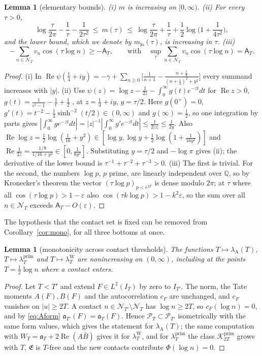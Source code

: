 \documentclass[11pt]{amsart}
\newtheorem{lemma}[theorem]{Lemma}
\theoremstyle{definition}
\theoremstyle{remark}
\newcommand{\Q}{\mathbb Q}
\newcommand{\Rel}{\operatorname{Re}}
\newcommand{\Kp}{\mathcal K^{\mathrm{prim}}_{2T}}
\newcommand{\PT}{\mathcal P_T}
\newcommand{\IT}{I_T}
\newcommand{\lamP}{\lambda^{\mathrm{prim}}_T}
\newcommand{\lamW}{\lambda^{\mathrm W}_T}
\newcommand{\lamA}{\lambda_{\mathrm A}(T)}
\newcommand{\cF}{c_F}
\newcommand{\Lev}{\mathfrak E}
\newcommand{\NT}{\mathcal N_T}
\newcommand{\Aconst}{\mathsf A_T}
\begin{document}
\begin{lemma}[elementary bounds]\label{lem:mbounds}
\emph{(i)} $m$ is increasing on $[0,\infty)$. \emph{(ii)} For every $\tau>0$,
\[
\log\frac{\tau}{2\pi}-\frac1\tau-\frac1{2\tau^2}\ \le\ m(\tau)\ \le\ \log\frac{\tau}{2\pi}+\frac1\tau+\frac12\log\Big(1+\frac1{4\tau^2}\Big),
\]
and the lower bound, which we denote by $m_{\mathrm{lo}}(\tau)$, is increasing in $\tau$. \emph{(iii)}
\[
-\sum_{n\in\NT}v_n\cos(\tau\log n)\ge-\Aconst,\qquad\text{with}\quad
\sup_\tau\sum_{n\in\NT}v_n\cos(\tau\log n)=\Aconst.
\]
\end{lemma}
\begin{proof}
(i) In $\Rel\psi(\frac14+iy)=-\gamma+\sum_{n\ge0}\big[\frac1{n+1}-\frac{n+\frac14}{(n+\frac14)^2+y^2}\big]$
every summand increases with $|y|$. (ii) Use $\psi(z)=\log z-\frac1{2z}-\int_0^\infty g(t)e^{-zt}dt$
for $\Rel z>0$, $g(t)=\frac1{e^t-1}-\frac1t+\frac12$ \cite[5.9.13]{DLMF}, at $z=\frac14+iy$, $y=\tau/2$.
Here $g(0^+)=0$, $g'(t)=t^{-2}-\frac14\sinh^{-2}(t/2)\in(0,\infty)$ and $g(\infty)=\frac12$, so one
integration by parts gives $|\int_0^\infty g e^{-zt}dt|=|z|^{-1}|\int_0^\infty g'e^{-zt}dt|\le\frac1{2|z|}\le\frac1{2y}$.
Also $\Rel\log z=\frac12\log(\frac1{16}+y^2)\in[\log y,\log y+\frac12\log(1+\frac1{16y^2})]$ and
$\Rel\frac1{2z}=\frac{1/8}{1/16+y^2}\in[0,\frac1{8y^2}]$. Substituting $y=\tau/2$ and $-\log\pi$
gives (ii); the derivative of the lower bound is $\tau^{-1}+\tau^{-2}+\tau^{-3}>0$. (iii) The
first is trivial. For the second, the numbers $\log p$, $p$ prime, are linearly independent over
$\Q$, so by Kronecker's theorem the vector $(\tau\log p)_{p<e^{2T}}$ is dense modulo $2\pi$; at
$\tau$ where all $\cos(\tau\log p)>1-\varepsilon$ also $\cos(\tau k\log p)>1-k^2\varepsilon$, so the
sum over all $n\in\NT$ exceeds $\Aconst-O(\varepsilon)$.
\end{proof}

The hypothesis that the contact set is fixed can be removed from Corollary~\ref{cor:mono}, for
all three bottoms at once.

\begin{lemma}[monotonicity across contact thresholds]\label{lem:monoT}
The functions $T\mapsto\lamA$, $T\mapsto\lamP$ and $T\mapsto\lamW$ are nonincreasing on $(0,\infty)$,
including at the points $T=\frac12\log n$ where a contact enters.
\end{lemma}
\begin{proof}
Let $T<T'$ and extend $F\in L^2(\IT)$ by zero to $I_{T'}$. The norm, the Tate moments $A(F),B(F)$ and
the autocorrelation $\cF$ are unchanged, and $\cF$ vanishes on $|u|\ge2T$. A contact
$n\in\mathcal N_{T'}\setminus\NT$ has $\log n\ge2T$, so $\cF(\log n)=0$, and by \eqref{eq:Aform}
$\mathfrak a_{T'}(F)=\mathfrak a_T(F)$. Hence $\PT\subset\mathcal P_{T'}$ isometrically with the same
form values, which gives the statement for $\lamA$; the same computation with $W_T=\mathfrak a_T+2\Rel(A\bar B)$
gives it for $\lamW$, and for $\lamP$ the class $\Kp$ grows with $T$, $\Lev$ is $T$-free and the new
contacts contribute $\Phi(\log n)=0$.
\end{proof}
\end{document}
